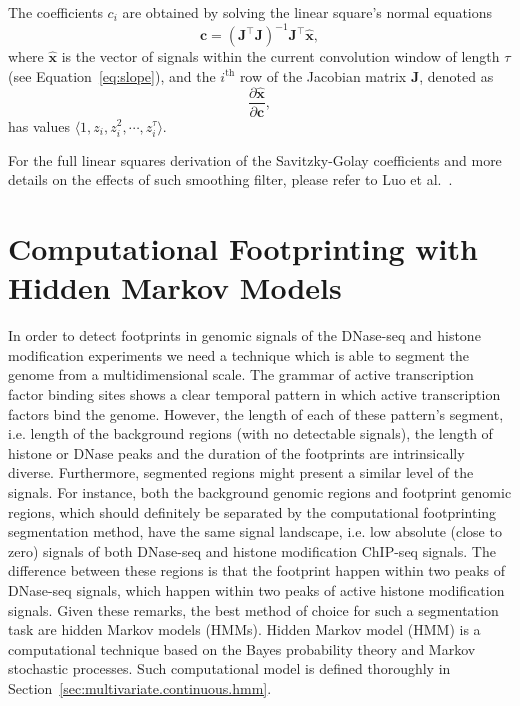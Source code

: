 The coefficients $c_i$ are obtained by solving the linear square's normal equations
\begin{equation}
  \label{eq:savitzky.golay.coeff}
  \mathbf{c} = {\left( \mathbf{J}^{\intercal} \mathbf{J} \right)}^{-1} \mathbf{J}^{\intercal} \mathbf{\hat{x}},
\end{equation}
where $\mathbf{\hat{x}} $ is the vector of signals within the current convolution window of length $\tau$ (see Equation~\ref{eq:slope}), and the  $i^{\text{th}}$ row of the Jacobian matrix $\mathbf{J}$, denoted as
\begin{equation}
  \label{eq:savitzky.golay.jacob}
  \frac{\partial \mathbf{\hat{x}} }{\partial \mathbf{c}},
\end{equation}
has values $ \langle 1, {z}_{i}, {z}_{i}^{2}, \cdots, {z}_{i}^{\tau} \rangle$.

For the full linear squares derivation of the Savitzky-Golay coefficients and more details on the effects of such smoothing filter, please refer to Luo et al.~\cite{luo2005}.

\section{Computational Footprinting with Hidden Markov Models}
\label{sec:computational.footprinting.hmm}

In order to detect footprints in genomic signals of the DNase-seq and histone modification experiments we need a technique which is able to segment the genome from a multidimensional scale. The grammar of active transcription factor binding sites shows a clear temporal pattern in which active transcription factors bind the genome. However, the length of each of these pattern's segment, i.e. length of the background regions (with no detectable signals), the length of histone or DNase peaks and the duration of the footprints are intrinsically diverse. Furthermore, segmented regions might present a similar level of the signals. For instance, both the background genomic regions and footprint genomic regions, which should definitely be separated by the computational footprinting segmentation method, have the same signal landscape, i.e. low absolute (close to zero) signals of both DNase-seq and histone modification ChIP-seq signals. The difference between these regions is that the footprint happen within two peaks of DNase-seq signals, which happen within two peaks of active histone modification signals. Given these remarks, the best method of choice for such a segmentation task are hidden Markov models (HMMs). Hidden Markov model (HMM) is a computational technique based on the Bayes probability theory and Markov stochastic processes. Such computational model is defined thoroughly in Section~\ref{sec:multivariate.continuous.hmm}.

